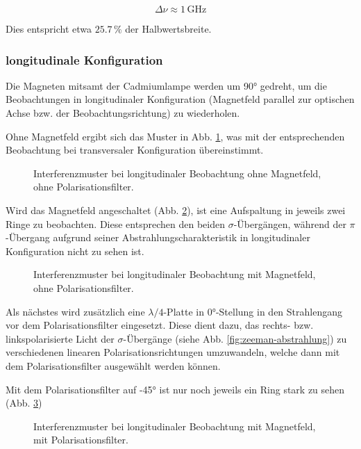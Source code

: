 \documentclass{article}
\begin{document}
\begin{multicols}{2}
\[
\Delta \nu \approx 1 \, \text{GHz}
\]

Dies entspricht etwa $25.7 \, \%$ der Halbwertsbreite.

\subsubsection{longitudinale Konfiguration}
Die Magneten mitsamt der Cadmiumlampe werden um \ang{90} gedreht,
um die Beobachtungen in longitudinaler Konfiguration (Magnetfeld parallel zur optischen Achse bzw. der Beobachtungsrichtung)
zu wiederholen.

Ohne Magnetfeld ergibt sich das Muster in Abb. \ref{fig:zeeman-longitudinal-ohne-ohne}, was mit der entsprechenden Beobachtung
bei transversaler Konfiguration übereinstimmt.
\begin{figure}[H]
  \centering
  \caption{Interferenzmuster bei longitudinaler Beobachtung ohne Magnetfeld, ohne Polarisationsfilter.}
  \label{fig:zeeman-longitudinal-ohne-ohne}
\end{figure}

Wird das Magnetfeld angeschaltet (Abb. \ref{fig:zeeman-longitudinal-mit-ohne}), ist eine Aufspaltung in jeweils zwei Ringe zu beobachten.
Diese entsprechen den beiden $\sigma$-Übergängen, während der $\pi$-Übergang aufgrund seiner Abstrahlungscharakteristik
in longitudinaler Konfiguration nicht zu sehen ist.
\begin{figure}[H]
  \centering
  \caption{Interferenzmuster bei longitudinaler Beobachtung mit Magnetfeld, ohne Polarisationsfilter.}
  \label{fig:zeeman-longitudinal-mit-ohne}
\end{figure}

Als nächstes wird zusätzlich eine $\lambda / 4$-Platte in \ang{0}-Stellung in den Strahlengang vor dem
Polarisationsfilter eingesetzt. Diese dient dazu, das rechts- bzw. linkspolarisierte Licht der $\sigma$-Übergänge
(siehe Abb. \ref{fig:zeeman-abstrahlung}) zu verschiedenen linearen Polarisationsrichtungen umzuwandeln,
welche dann mit dem Polarisationsfilter ausgewählt werden können.

Mit dem Polarisationsfilter auf \ang{-45} ist nur noch jeweils ein Ring stark zu sehen (Abb. \ref{fig:zeeman-longitudinal-mit--45})
\begin{figure}[H]
  \centering
  \caption{Interferenzmuster bei longitudinaler Beobachtung mit Magnetfeld, mit Polarisationsfilter.}
  \label{fig:zeeman-longitudinal-mit--45}
\end{figure}


\end{multicols}
\end{document}
